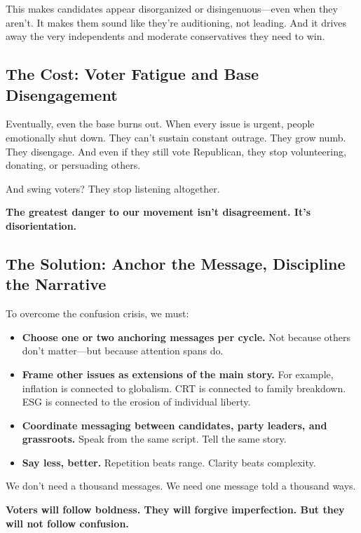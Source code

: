 This makes candidates appear disorganized or disingenuous—even when they aren’t. It makes them sound like they’re auditioning, not leading. And it drives away the very independents and moderate conservatives they need to win.

\subsection*{The Cost: Voter Fatigue and Base Disengagement}

Eventually, even the base burns out. When every issue is urgent, people emotionally shut down. They can’t sustain constant outrage. They grow numb. They disengage. And even if they still vote Republican, they stop volunteering, donating, or persuading others.

And swing voters? They stop listening altogether.

\textbf{The greatest danger to our movement isn’t disagreement. It’s disorientation.}

\subsection*{The Solution: Anchor the Message, Discipline the Narrative}

To overcome the confusion crisis, we must:
\begin{itemize}
    \item \textbf{Choose one or two anchoring messages per cycle.} Not because others don’t matter—but because attention spans do.
    \item \textbf{Frame other issues as extensions of the main story.} For example, inflation is connected to globalism. CRT is connected to family breakdown. ESG is connected to the erosion of individual liberty.
    \item \textbf{Coordinate messaging between candidates, party leaders, and grassroots.} Speak from the same script. Tell the same story.
    \item \textbf{Say less, better.} Repetition beats range. Clarity beats complexity.
\end{itemize}

We don’t need a thousand messages. We need one message told a thousand ways.

\textbf{Voters will follow boldness. They will forgive imperfection. But they will not follow confusion.}
















